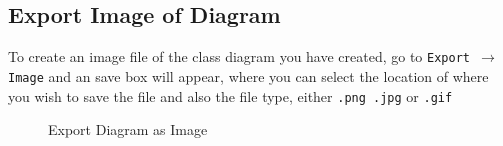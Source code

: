 \documentclass[a4paper]{article}
\begin{document}
{\subsection{Export Image of Diagram}
To create an image file of the class diagram you have created, go to \texttt{Export $\rightarrow$ Image} and an save box will appear, where you can select the location of where you wish to save the file and also the file type, either
\texttt{.png .jpg} or \texttt{.gif} 
\begin{figure}[H]
\begin{center}
 \imagespace
{}
\caption{Export Diagram as Image}
\end{center}
\end{figure}

}
\end{document}
